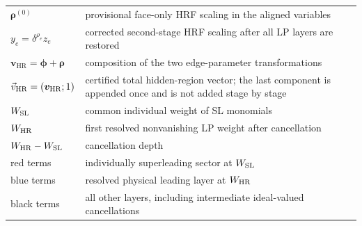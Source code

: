 \documentclass[a4paper,11pt]{article}
\newcommand{\HR}{\mathrm{HR}}
\newcommand{\WSL}{W_{\rm SL}}
\newcommand{\WHR}{W_{\rm HR}}
\newcommand{\vHR}{\vec v_{\rm HR}}
\newcommand{\SLcolour}[1]{{\color{red}#1}}
\newcommand{\HRcolour}[1]{{\color{blue}#1}}
\newcommand{\Othercolour}[1]{{\color{black}#1}}
\begin{document}
\begin{center}
\begin{tabular}{@{}p{}p{}@{}}
\(\boldsymbol\rho^{(0)}\) & provisional face-only HRF scaling in the aligned
  variables\\
\(y_e=\delta^{\rho_e}z_e\) & corrected second-stage HRF scaling after all LP
  layers are restored\\
\(\boldsymbol v_{\HR}=\boldsymbol\phi+\boldsymbol\rho\) & composition of the
  two edge-parameter transformations\\
\(\vHR=(\boldsymbol v_{\HR};1)\) & certified total hidden-region vector; the
  last component is appended once and is not added stage by stage\\
\(\WSL\) & common individual weight of SL monomials\\
\(\WHR\) & first resolved nonvanishing LP weight after cancellation\\
\(\WHR-\WSL\) & cancellation depth\\
\SLcolour{red terms} & individually superleading sector at \(\WSL\)\\
\HRcolour{blue terms} & resolved physical leading layer at \(\WHR\)\\
\Othercolour{black terms} & all other layers, including intermediate
  ideal-valued cancellations\\
\bottomrule
\end{tabular}
\end{center}






\end{document}
